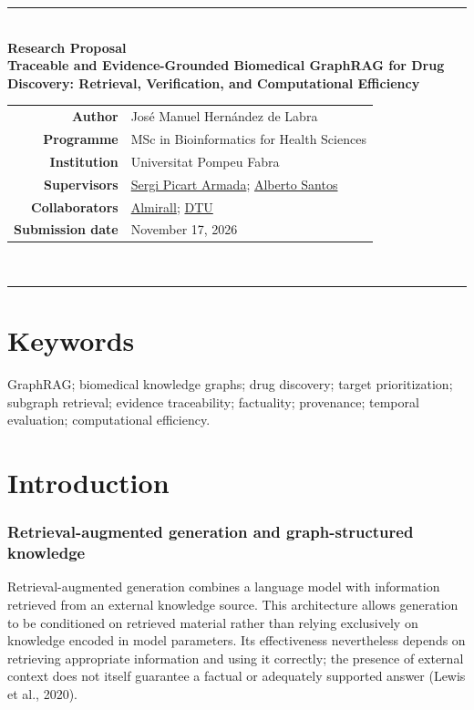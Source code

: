 
\begin{center}
{\color{accent}\rule{0.72\linewidth}{0.6pt}}\\[0.8em]
{\Large\bfseries\color{ink}Research Proposal}\\[0.55em]
{\LARGE\bfseries\color{ink}Traceable and Evidence-Grounded Biomedical GraphRAG for Drug Discovery: Retrieval, Verification, and Computational Efficiency}\\[1em]
\begin{tabular}{@{}rl@{}}
\textbf{Author} & José Manuel Hernández de Labra\\
\textbf{Programme} & MSc in Bioinformatics for Health Sciences\\
\textbf{Institution} & Universitat Pompeu Fabra\\
\textbf{Supervisors} & \href{https://es.linkedin.com/in/sergi-picart}{Sergi Picart Armada}; \href{https://scholar.google.com/citations?user=8ufdIFAAAAAJ&hl=en}{Alberto Santos}\\
\textbf{Collaborators} & \href{https://www.almirall.com/}{Almirall}; \href{https://www.dtu.dk/}{DTU}\\
\textbf{Submission date} & November 17, 2026
\end{tabular}\\[0.7em]
{\color{accent}\rule{0.72\linewidth}{0.6pt}}
\end{center}

\section{Keywords}\label{keywords}

GraphRAG; biomedical knowledge graphs; drug discovery; target prioritization; subgraph retrieval; evidence traceability; factuality; provenance; temporal evaluation; computational efficiency.

\section{Introduction}\label{introduction}

\subsubsection{Retrieval-augmented generation and graph-structured knowledge}\label{retrieval-augmented-generation-and-graph-structured-knowledge}

Retrieval-augmented generation combines a language model with information retrieved from an external knowledge source. This architecture allows generation to be conditioned on retrieved material rather than relying exclusively on knowledge encoded in model parameters. Its effectiveness nevertheless depends on retrieving appropriate information and using it correctly; the presence of external context does not itself guarantee a factual or adequately supported answer (Lewis et al., 2020).

